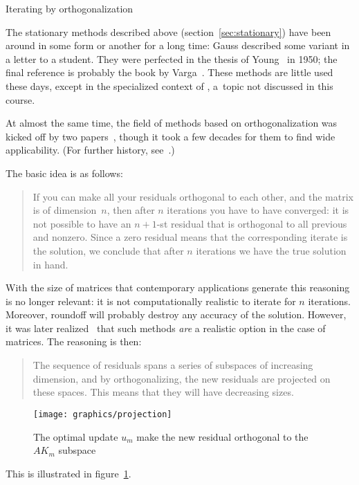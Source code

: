  {Iterating by orthogonalization}
\label{sec:fom}

The stationary methods described above (section~\ref{sec:stationary})
have been around in some form or another for a long time: Gauss
described some variant in a letter to a student. They were perfected
in the thesis of Young~\cite{Young:thesis} in 1950; the final
reference is probably the book by
Varga~\cite{Varga:iterative-analysis}. These methods are little used
these days, except in the specialized context of 
, a~topic not discussed in this course.

At almost the same time, the
field of methods based on orthogonalization was kicked off by two
papers~\cite{Lanczos1952:solution_of_systems,HestenesStiefel1952:cg},
though it took a few decades for them to find wide applicability. (For
further history, see~\cite{GolubOleary:cg-history}.)

The basic idea is as follows:
\begin{quote}
  If you can make all your residuals orthogonal to each other, and the
  matrix is of dimension~$n$, then after $n$ iterations you have to
  have converged: it is not possible to have an $n+1$-st residual that
  is orthogonal to all previous and nonzero. Since a zero residual
  means that the corresponding iterate is the solution, we conclude
  that after $n$ iterations we have the true solution in hand.
\end{quote}
With the size of matrices that contemporary applications generate this
reasoning is no longer relevant: it is not computationally realistic
to iterate for $n$ iterations. Moreover, roundoff will probably destroy any
accuracy of the solution.
%
However, it was later realized~\cite{Reid1971:cg} that such methods
\emph{are} a realistic option in the case of  matrices. The
reasoning is then:
\begin{quote}
  The sequence of residuals spans a series of subspaces of increasing
  dimension, and by orthogonalizing, the new residuals are projected on
  these spaces. This means that they will have decreasing sizes.
\end{quote}
\begin{figure}[ht]
  \texttt{[image: graphics/projection]}
  \caption{The optimal update $u_m$ make the new residual orthogonal to
    the $AK_m$ subspace}
  \label{fig:res-projection}
\end{figure}
This is illustrated in figure~\ref{fig:res-projection}.

